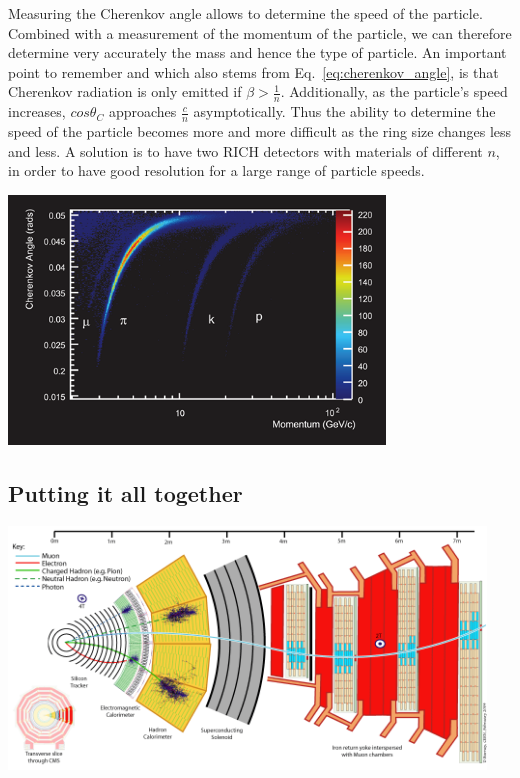 Measuring the Cherenkov angle allows to determine the speed of the particle. Combined with a measurement of the momentum of the particle, we can therefore determine very accurately the mass and hence the type of particle. An important point to remember and which also stems from Eq.~\ref{eq:cherenkov_angle}, is that Cherenkov radiation is only emitted if $\beta>\frac{1}{n}$. Additionally, as the particle's speed increases, $cos\theta_{C}$ approaches $\frac{c}{n}$ asymptotically. Thus the ability to determine the speed of the particle becomes more and more difficult as the ring size changes less and less. A solution is to have two RICH detectors with materials of different $n$, in order to have good resolution for a large range of particle speeds.
\begin{center}
\includegraphics[width=0.75\textwidth]{fig/detector/lhcb_cherenkov_vs_momentum.png}
\end{center}

\subsection{Putting it all together}
\label{sec:detectorSummary}
\begin{center}
\includegraphics[width=0.95\textwidth]{fig/detector/cms_slice.png}
\end{center}

